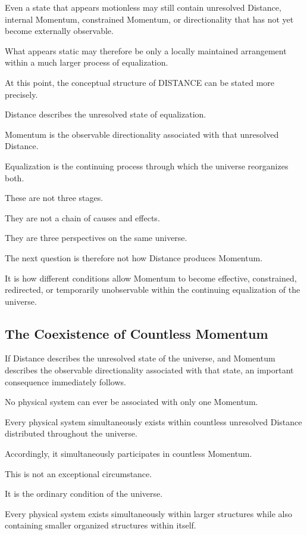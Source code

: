 Even a state that appears motionless may still contain unresolved Distance, internal Momentum, constrained Momentum, or directionality that has not yet become externally observable.

What appears static may therefore be only a locally maintained arrangement within a much larger process of equalization.

At this point, the conceptual structure of DISTANCE can be stated more precisely.

Distance describes the unresolved state of equalization.

Momentum is the observable directionality associated with that unresolved Distance.

Equalization is the continuing process through which the universe reorganizes both.

These are not three stages.

They are not a chain of causes and effects.

They are three perspectives on the same universe.

The next question is therefore not how Distance produces Momentum.

It is how different conditions allow Momentum to become effective, constrained, redirected, or temporarily unobservable within the continuing equalization of the universe.

\subsection*{\textbf{The Coexistence of Countless Momentum}}

If Distance describes the unresolved state of the universe, and Momentum describes the observable directionality associated with that state, an important consequence immediately follows.

No physical system can ever be associated with only one Momentum.

Every physical system simultaneously exists within countless unresolved Distance distributed throughout the universe.

Accordingly, it simultaneously participates in countless Momentum.

This is not an exceptional circumstance.

It is the ordinary condition of the universe.

Every physical system exists simultaneously within larger structures while also containing smaller organized structures within itself.

